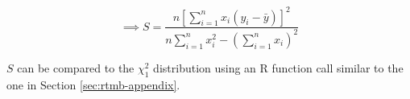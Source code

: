 \documentclass{article}
\newcommand{\lr}[1]{\left( #1 \right)}
\newcommand{\lrsq}[1]{\left[ #1 \right]}
\newcommand{\sumN}{\sum_{i=1}^n}
\newcommand{\yBar}{\bar{y}}
\begin{document}
\begin{equation*}
  \implies S =
  \frac{n \lrsq{\sumN x_i (y_i - \yBar)}^2}{n \sumN x_i^2 - \lr{\sumN x_i}^2}
\end{equation*}

$S$ can be compared to the $\chi^2_1$ distribution using an R function call
similar to the one in Section \ref{sec:rtmb-appendix}. 





\end{document}
